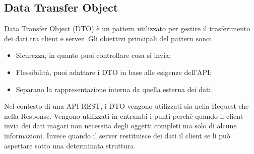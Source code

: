 \subsection*{Data Transfer Object}
Data Transfer Object (DTO) è un pattern utilizzato per gestire il trasferimento dei dati tra client e server. Gli obiettivi principali del pattern sono:
\begin{itemize}
\item Sicurezza, in quanto puoi controllare cosa si invia;
\item Flessibilità, puoi adattare i DTO in base alle esigenze dell'API;
\item Separano la rappresentazione interna da quella esterna dei dati.
\end{itemize}
Nel contesto di una API REST, i DTO vengono utilizzati sia nella Request che nella Response. Vengono utilizzati in entrambi i punti perchè quando il client invia dei dati magari non necessita degli oggetti completi ma solo di alcune informazioni. Invece quando il server restituisce dei dati il client se li può aspettare sotto una determinata struttura.\\


